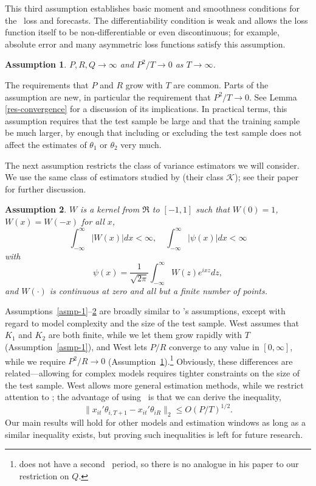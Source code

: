 \documentclass[11pt]{article}
\newtheorem{asmp}{Assumption}
\newcommand{\citepos}[1]{\citeauthor{#1}'s \citeyearpar{#1}}
\begin{document}
This third assumption establishes basic moment and smoothness
conditions for the \oos\ loss and forecasts.  The differentiability
condition is weak and allows the loss function itself to be
non-differentiable or even discontinuous; for example, absolute error
and many asymmetric loss functions satisfy this assumption.

\begin{asmp} \label{asmp-4} $P, R, Q \to\infty$ and $P^2/T \to 0$ as
  $T \to \infty$.
\end{asmp}

The requirements that $P$ and $R$ grow with $T$ are common.  Parts of
the assumption are new, in particular the requirement that $P^2/T \to
0$.  See Lemma \ref{res-convergence} for a discussion of its
implications.  In practical terms, this assumption requires that the
test sample be large and that the training sample be much larger, by
enough that including or excluding the test sample does not affect the
estimates of $\theta_1$ or $\theta_2$ very much.

The next assumption restricts the class of variance estimators we will
consider.  We use the same class of estimators studied by
\citet{JoD:00} (their class $\mathcal{K}$); see
their paper for further discussion.

\begin{asmp}
  \label{asmp-5} $W$ is a kernel from
$\Re$ to $[-1,1]$ such that $W(0) = 1$, $W(x) = W(-x)$ for all $x$,
\begin{equation*}
  \int_{-\infty}^{\infty} \lvert W(x) \rvert dx < \infty, \quad
  \int_{-\infty}^{\infty} \lvert \psi(x) \rvert dx < \infty
\end{equation*}
with
\begin{equation*}
  \psi(x) = \frac1{\sqrt{2\pi}} \int_{-\infty}^{\infty} W(z) e^{ixz}dz,
\end{equation*}
and $W(\cdot)$ is continuous at zero and all but a finite number of
points.
\end{asmp}

Assumptions~\ref{asmp-1}--\ref{asmp-5} are broadly similar to
\citepos{Wes:96} assumptions, except with regard to model complexity
and the size of the test sample.  West assumes that $K_1$ and $K_2$
are both finite, while we let them grow rapidly with $T$
(Assumption~\ref{asmp-1}), and West lets $P/R$ converge to any value
in $[0,\infty]$, while we require $P^2/R \to 0$
(Assumption~\ref{asmp-4}).\footnote{\citet{Wes:96} does not have a
  second \oos\ period, so there is no analogue in his paper to our
  restriction on $Q$.}  Obviously, these differences are
related---allowing for complex models requires tighter constraints on
the size of the test sample.  West allows more general estimation
methods, while we restrict attention to \ols; the advantage of using
\ols\ is that we can derive the inequality,
\begin{equation*}
  \| x_{it}'\theta_{i,T+1} - x_{it}'\theta_{iR} \|_2 \leq O(P/T)^{1/2}.
\end{equation*}
Our main results will hold for other models and estimation windows as
long as a similar inequality exists, but proving such inequalities is
left for future research.
\end{document}
